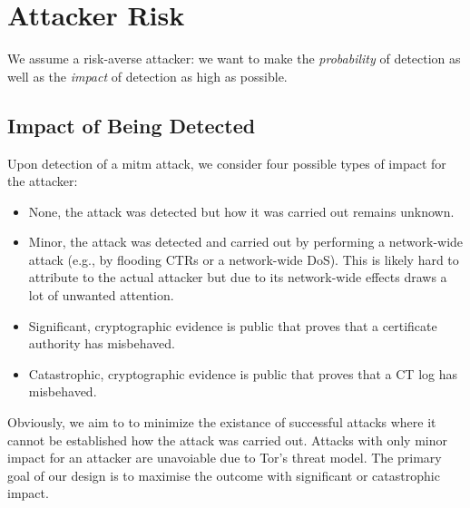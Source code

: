 \section{Attacker Risk} \label{sec:risk}
We assume a risk-averse attacker: we want to make the \emph{probability} of
detection as well as the \emph{impact} of detection as high as possible.

\subsection{Impact of Being Detected}
Upon detection of a mitm attack, we consider four possible types of impact for
the attacker:
\begin{itemize}
    \item None, the attack was detected but how it was carried out remains
    unknown.
    \item Minor, the attack was detected and carried out by performing a
    network-wide attack (e.g., by flooding CTRs or a network-wide DoS). This is
    likely hard to attribute to the actual attacker but due to its network-wide
    effects draws a lot of unwanted attention.
   \item Significant, cryptographic evidence is public that proves that a
   certificate authority has misbehaved.
   \item Catastrophic, cryptographic evidence is public that proves that a CT
   log has misbehaved.
\end{itemize}

Obviously, we aim to to minimize the existance of successful attacks where it
cannot be established how the attack was carried out. Attacks with only minor
impact for an attacker are unavoiable due to Tor's threat model. The primary
goal of our design is to maximise the outcome with significant or catastrophic
impact.


